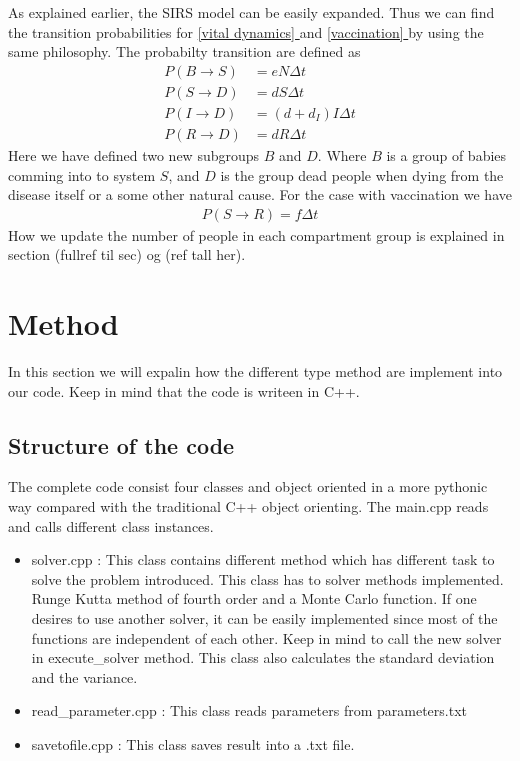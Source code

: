 \documentclass[a4paper, 10pt]{article}
\newcommand*{\fullref}[1]{\hyperref[{#1}]{\autoref*{#1} \nameref*{#1}}}
\begin{document}
As explained earlier, the SIRS model can be easily expanded. Thus we can find the transition probabilities for
\fullref{vital dynamics} and \fullref{vaccination} by using the same philosophy. The probabilty transition are
defined as
\begin{align}
P(B \rightarrow S) &= eN \Delta t\\
  P(S \rightarrow D) &= dS \Delta t\\
  P(I \rightarrow D) &= (d + d_{I})I \Delta t\\
  P(R \rightarrow D) &= dR \Delta t
\end{align}
Here we have defined two new subgroups $B$ and $D$.
Where $B$ is a group of babies comming into to system $S$, and $D$ is the group dead people when dying
from the disease itself or a some other natural cause. For the case with vaccination we have
\begin{align}
  	P(S \rightarrow R) = f \Delta t
\end{align}
How we update the number of people in each compartment group is explained in section (fullref til sec) og (ref tall her).
\section{Method}
In this section we will expalin how the different type method are implement
into our code. Keep in mind that the code is writeen in C++.
\subsection{Structure of the code}
The complete code consist four classes and object oriented in a more pythonic way compared
with the traditional C++ object orienting. The main.cpp reads and calls different class instances.
\begin{itemize}
  \item solver.cpp : This class contains different method which has different task to solve the problem introduced.
  This class has to solver methods implemented. Runge Kutta method of fourth order and a Monte Carlo function.
  If one desires to use another solver, it can be easily implemented since most of the functions are independent of each other.
  Keep in mind to call the new solver in execute\_solver method. This class also calculates the
  standard deviation and the variance.
  \item read\_parameter.cpp : This class reads parameters from parameters.txt
  \item savetofile.cpp : This class saves result into a .txt file.
\end{itemize}
\end{document}
